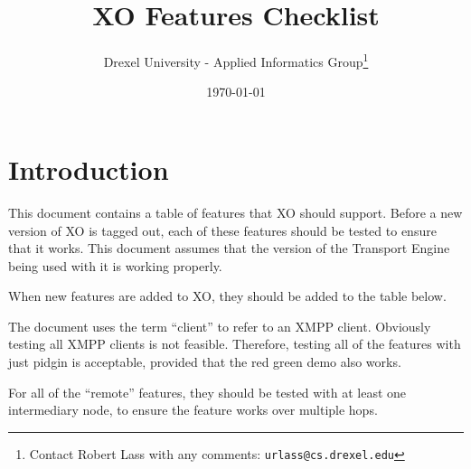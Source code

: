 \documentclass{article}
\begin{document}
\author{Drexel University - Applied Informatics Group\footnote{Contact Robert Lass with any comments: \texttt{urlass@cs.drexel.edu}}}
\title{XO Features Checklist}
\date{\today}

\maketitle

\section{Introduction}
This document contains a table of features that XO should support.  Before a
new version of XO is tagged out, each of these features should be tested to
ensure that it works.  This document assumes that the version of the Transport
Engine being used with it is working properly.

When new features are added to XO, they should be added to the table below.

The document uses the term ``client'' to refer to an XMPP client.  Obviously
testing all XMPP clients is not feasible.  Therefore, testing all of the
features with just pidgin is acceptable, provided that the red green demo also
works.

For all of the ``remote'' features, they should be tested with at least one
intermediary node, to ensure the feature works over multiple hops.
\end{document}
